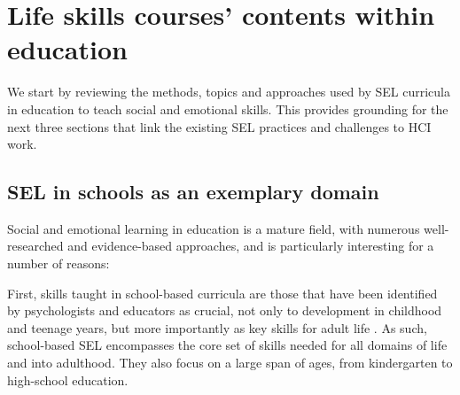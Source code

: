 \documentclass[prodmode,acmtochi]{acmsmall}
\newcommand{\rephrase}[1]{\textrm{\textrm{\textcolor{gray}{#1}}}}
\begin{document}
\section{Life skills courses' contents within education}
\label{sec:SEL}
We start by reviewing the methods, topics and approaches used by SEL curricula in education to teach social and emotional skills. This provides grounding for the next three sections that link the existing SEL practices and challenges to HCI work.
%


\subsection{SEL in schools as an exemplary domain}
\label{sec:reasons}
Social and emotional learning in education is a mature field, with numerous well-researched and evidence-based approaches, and is particularly interesting for a number of reasons:

First, skills taught in school-based curricula are those that have been identified by psychologists and educators as crucial, not only to development in childhood and teenage years, but more importantly as key skills for adult life \cite{Greenberg2010}.  As such, school-based SEL encompasses the core set of skills needed for all domains of life and into adulthood. They also focus on a large span of ages, from kindergarten to high-school education.   %
\end{document}
